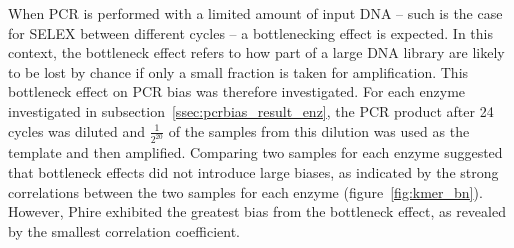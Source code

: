 \documentclass[a4paper, numbers=noenddot]{scrbook}
\begin{document}
When PCR is performed with a limited amount of input DNA -- such is the case for SELEX between different cycles -- a bottlenecking effect is expected.  In this context, the bottleneck effect refers to how part of a large DNA library are likely to be lost by chance if only a small fraction is taken for amplification.  This bottleneck effect on PCR bias was therefore investigated.  For each enzyme investigated in subsection~\ref{ssec:pcrbias_result_enz}, the PCR product after 24 cycles was diluted and $\frac{1}{2^{20}}$ of the samples from this dilution was used as the template and then amplified.  Comparing two samples for each enzyme suggested that bottleneck effects did not introduce large biases, as indicated by the strong correlations between the two samples for each enzyme (figure~\ref{fig:kmer_bn}).  However, Phire exhibited the greatest bias from the bottleneck effect, as revealed by the smallest correlation coefficient.
\end{document}
